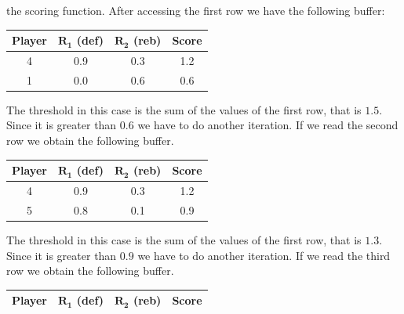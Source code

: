 \documentclass[12pt, a4paper]{report}
\begin{document}
\begin{enumerate}
            the scoring function. After accessing the first row we have the following buffer: 
            \begin{table}[H]
                \centering
                \begin{tabular}{c|cc|c}
                \hline
                \textbf{Player} & \textbf{$\boldsymbol{R_1}$ (def)} & \textbf{$\boldsymbol{R_2}$ (reb)} & \textbf{Score} \\ \hline
                4               & 0.9                               & 0.3                               & 1.2            \\
                1               & 0.0                               & 0.6                               & 0.6            \\ \hline
                \end{tabular}
            \end{table}
            The threshold in this case is the sum of the values of the first row, that is $1.5$. Since it is greater than $0.6$ we have to do
            another iteration. If we read the second row we obtain the following buffer. 
            \begin{table}[H]
                \centering
                \begin{tabular}{c|cc|c}
                \hline
                \textbf{Player} & \textbf{$\boldsymbol{R_1}$ (def)} & \textbf{$\boldsymbol{R_2}$ (reb)} & \textbf{Score} \\ \hline
                4               & 0.9                               & 0.3                               & 1.2            \\
                5               & 0.8                               & 0.1                               & 0.9            \\ \hline
                \end{tabular}
            \end{table}
            The threshold in this case is the sum of the values of the first row, that is $1.3$. Since it is greater than $0.9$ we have to do
            another iteration. If we read the third row we obtain the following buffer. 
            \begin{table}[H]
                \centering
                \begin{tabular}{c|cc|c}
                \hline
                \textbf{Player} & \textbf{$\boldsymbol{R_1}$ (def)} & \textbf{$\boldsymbol{R_2}$ (reb)} & \textbf{Score} \\ \hline

\end{tabular}
\end{table}
\end{enumerate}
\end{document}
